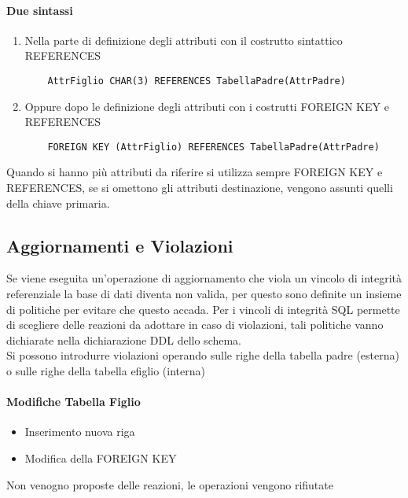 \paragraph*{Due sintassi} 
\begin{enumerate}
  \item Nella parte di definizione degli attributi con il costrutto sintattico
  REFERENCES
  \begin{lstlisting}
    AttrFiglio CHAR(3) REFERENCES TabellaPadre(AttrPadre)
  \end{lstlisting}
  \item Oppure dopo le definizione degli attributi con i costrutti FOREIGN KEY e REFERENCES
  \begin{lstlisting}
    FOREIGN KEY (AttrFiglio) REFERENCES TabellaPadre(AttrPadre)
  \end{lstlisting}
\end{enumerate}
Quando si hanno più attributi da riferire si utilizza sempre FOREIGN KEY e REFERENCES, se si
omettono gli attributi destinazione, vengono assunti quelli della chiave primaria.
\subsection{Aggiornamenti e Violazioni}
Se viene eseguita un'operazione di aggiornamento che viola un vincolo di integrità referenziale
la base di dati diventa non valida, per questo sono definite un insieme di politiche
per evitare che questo accada. Per i vincoli di integrità SQL permette di
scegliere delle reazioni da adottare in caso di violazioni, tali politiche vanno
dichiarate nella dichiarazione DDL dello schema.\\
Si possono introdurre violazioni operando sulle righe della tabella padre (esterna) o sulle righe
della tabella efiglio (interna)
\paragraph*{Modifiche Tabella Figlio}
\begin{itemize}
  \item Inserimento nuova riga
  \item Modifica della FOREIGN KEY
\end{itemize}
Non venogno proposte delle reazioni, le operazioni vengono rifiutate
